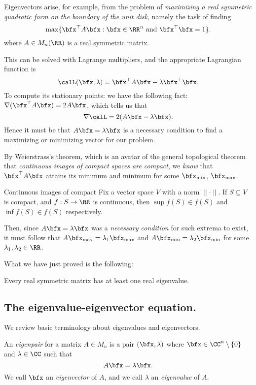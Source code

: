 \documentclass{article}
\newcommand{\grad}{\ensuremath{\nabla}}
\begin{document}
Eigenvectors arise, for example, from the problem of \textit{maximizing a real symmetric quadratic form on the boundary of the unit disk}, namely the task of finding
\[
    \max\{\bfx^\top A \bfx: \bfx \in \RR^n \text{ and } \bfx^\top \bfx = 1\}.
\]
where $A \in M_n(\RR)$ is a real symmetric matrix.

This can be solved with Lagrange multipliers, and the appropriate Lagrangian function is 
\[
    \calL(\bfx, \lambda) = \bfx^\top A \bfx - \lambda \bfx^\top \bfx.
\]
To compute its stationary points: we have the following fact: $\grad(\bfx^\top A \bfx) = 2A\bfx$, which tells us that
\[
    \grad \calL = 2(A\bfx - \lambda\bfx).
\]
Hence it must be that $A\bfx = \lambda \bfx$ is a necessary condition to find a maximizing or minimizing vector for our problem.

By Weierstrass's theorem, which is an avatar of the general topological theorem that \textit{continuous images of compact spaces are compact}, we \textit{know} that $\bfx^\top A \bfx$ attains its minimum and minimum for some $\bfx_{\min}$, $\bfx_{\max}$.

\begin{theorem}[Weierstrass]
    Continuous images of compact
    Fix a vector space $V$ with a norm $\lVert\cdot\rVert$.
    If $S \subseteq V$ is compact, and $f: S \to \RR$ is continuous, then $\sup f(S) \in f(S)$ and $\inf f(S) \in f(S)$ respectively.
\end{theorem}

Then, since $A\bfx = \lambda\bfx$ was a \textit{necessary condition} for such extrema to exist, it must follow that $A\bfx_{\max} = \lambda_1 \bfx_{\max}$ and $A\bfx_{\min} = \lambda_2 \bfx_{\min}$ for some $\lambda_1,\lambda_2 \in \RR$.

What we have just proved is the following:

\begin{theorem}
    Every real symmetric matrix has at least one real eigenvalue.
\end{theorem}

\subsection{The eigenvalue-eigenvector equation.}

We review basic terminology about eigenvalues and eigenvectors.

\begin{definition}
    An \textit{eigenpair} for a matrix $A \in M_n$ is a pair $(\bfx, \lambda)$ where $\bfx \in \CC^n\setminus\{0\}$ and $\lambda \in \CC$ such that
    \[
        A\bfx = \lambda\bfx.
    \]
    We call $\bfx$ an \textit{eigenvector} of $A$, and we call $\lambda$ an \textit{eigenvalue} of $A$.
\end{definition}
\end{document}
